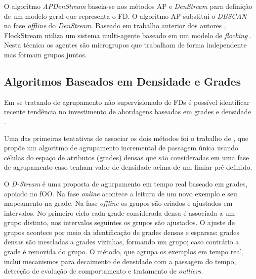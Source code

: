 O algoritmo \emph{APDenStream} \cite{Zhang2013} baseia-se nos métodos AP e \emph{DenStream} para definição de um modelo geral que representa o FD. O algoritmo AP substitui o \emph{DBSCAN} na fase \emph{offline} do \emph{DenStream}. Baseado em trabalho anterior dos autores \cite{Forestiero2009}, FlockStream \cite{Forestiero2013} utiliza um sistema multi-agente baseado em um modelo de \emph{flocking} \cite{Kennedy2001}. Nesta técnica os agentes são microgrupos que trabalham de forma independente mas formam grupos juntos.

\subsection{Algoritmos Baseados em Densidade e Grades}

Em se tratando de agrupamento não supervisionado de FDs é possível identificar recente tendência no investimento de abordagens baseadas em grades e densidade \cite{Amini2011,Amini2014}.

Uma das primeiras tentativas de associar os dois métodos foi o trabalho de , que propõe um algoritmo de agrupamento incremental de passagem única usando células do espaço de atributos (grades) densas que são consideradas em uma fase de agrupamento caso tenham valor de densidade acima de um limiar pré-definido.

O \emph{D-Stream} \cite{Chen2007, Tu2009} é uma proposta de agurpamento em tempo real baseado em grades, apoiado no fOO. Na fase \emph{online} acontece a leitura de um novo exemplo e seu mapeamento na grade. Na fase \emph{offline} os grupos são criados e ajustados em intervalos. No primeiro ciclo cada grade considerada densa é associada a um grupo distinto, nos intervalos seguintes os grupos são ajustados. O ajuste de grupos acontece por meio da identificação de grades densas e esparsas: grades densas são mescladas a grades vizinhas, formando um grupo; caso contrário a grade é removida do grupo. O método, que agrupa os exemplos em tempo real, inclui mecanismos para decaimento de densidade com a passagem do tempo, detecção de evolução de comportamento e tratamento de \emph{outliers}.


